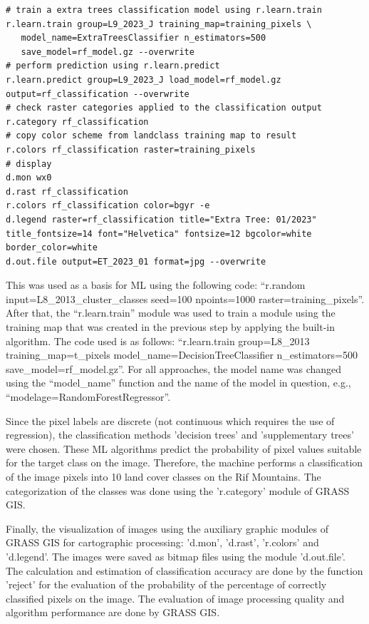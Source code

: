 \documentclass[geomatics,article,submit,pdftex,moreauthors]{Definitions/mdpi}
\begin{document}
\begin{footnotesize}
\begin{verbatim}
# train a extra trees classification model using r.learn.train
r.learn.train group=L9_2023_J training_map=training_pixels \
   model_name=ExtraTreesClassifier n_estimators=500 
   save_model=rf_model.gz --overwrite
# perform prediction using r.learn.predict
r.learn.predict group=L9_2023_J load_model=rf_model.gz  output=rf_classification --overwrite
# check raster categories applied to the classification output
r.category rf_classification
# copy color scheme from landclass training map to result
r.colors rf_classification raster=training_pixels
# display
d.mon wx0
d.rast rf_classification
r.colors rf_classification color=bgyr -e
d.legend raster=rf_classification title="Extra Tree: 01/2023" 
title_fontsize=14 font="Helvetica" fontsize=12 bgcolor=white 
border_color=white
d.out.file output=ET_2023_01 format=jpg --overwrite
\end{verbatim}
\end{footnotesize}

This was used as a basis for ML using the following code: “r.random input=L8\_2013\_cluster\_classes seed=100 npoints=1000 raster=training\_pixels”. After that, the “r.learn.train” module was used to train a module using the training map that was created in the previous step by applying the built-in algorithm. The code used is as follows: “r.learn.train group=L8\_2013 training\_map=t\_pixels model\_name=DecisionTreeClassifier n\_estimators=500 save\_model=rf\_model.gz”. For all approaches, the model name was changed using the “model\_name” function and the name of the model in question, e.g., “modelage=RandomForestRegressor”.

Since the pixel labels are discrete (not continuous which requires the use of regression), the classification methods 'decision trees' and 'supplementary trees' were chosen. These ML algorithms predict the probability of pixel values suitable for the target class on the image. Therefore, the machine performs a classification of the image pixels into 10 land cover classes on the Rif Mountains. The categorization of the classes was done using the 'r.category' module of GRASS GIS. 

Finally, the visualization of images using the auxiliary graphic modules of GRASS GIS for cartographic processing: 'd.mon', 'd.rast', 'r.colors' and 'd.legend'. The images were saved as bitmap files using the module 'd.out.file'. The calculation and estimation of classification accuracy are done by the function 'reject' for the evaluation of the probability of the percentage of correctly classified pixels on the image. The evaluation of image processing quality and algorithm performance are done by GRASS GIS.
\end{document}
